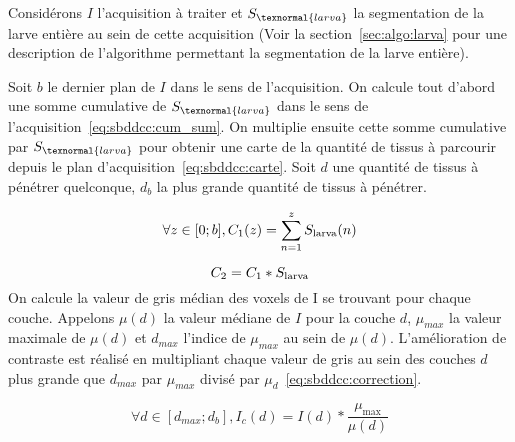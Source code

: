 \documentclass[\main/main.tex]{subfiles}
\begin{document}
%
Considérons $I$ l'acquisition à traiter et $S_{\texnormal{larva}}$ la segmentation de la larve entière au sein de cette acquisition (Voir la section~\ref{sec:algo:larva} pour une description de l'algorithme permettant la segmentation de la larve entière).

%
Soit $b$ le dernier plan de $I$ dans le sens de l'acquisition.
%
On calcule tout d'abord une somme cumulative de $S_{\texnormal{larva}}$ dans le sens de l'acquisition~\eqref{eq:sbddcc:cum_sum}.
%
On multiplie ensuite cette somme cumulative par $S_{\texnormal{larva}}$ pour obtenir une carte de la quantité de tissus à parcourir depuis le plan d'acquisition~\eqref{eq:sbddcc:carte}.
%
Soit $d$ une quantité de tissus à pénétrer quelconque, $d_b$ la plus grande quantité de tissus à pénétrer.

\begin{equation}
    \label{eq:sbddcc:cum_sum}
    \forall z \in [0;b], 
        C_1(z)=\sum_{n=1}^{z}S_{\textnormal{larva}}(n)
\end{equation}

\begin{equation}
    \label{eq:sbddcc:carte}
    C_2=C_1 * S_{\textnormal{larva}}
\end{equation}
%
On calcule la valeur de gris médian des voxels de I se trouvant pour chaque couche.
%
Appelons $\mu{}(d)$ la valeur médiane de $I$ pour la couche $d$, $\mu_{max}$ la valeur maximale de $\mu{}(d)$ et $d_{max}$ l'indice de $\mu_{max}$ au sein de $\mu{}(d)$.
%
L'amélioration de contraste est réalisé en multipliant chaque valeur de gris au sein des couches $d$ plus grande que $d_{max}$ par $\mu_{max}$ divisé par $\mu_d$~\eqref{eq:sbddcc:correction}.

\begin{equation}
    \label{eq:sbddcc:correction}
    \forall d \in [d_{max};d_b],
        I_{c}(d)=I(d)*\frac{\mu_{\max}}{\mu(d)}
\end{equation}
\end{document}
